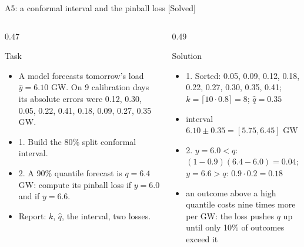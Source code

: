 \begin{frame}{A5: a conformal interval and the pinball loss [Solved]}
\itemsize{\scriptsize}
\begin{columns}[T]
\begin{column}{0.47\textwidth}
\begin{block}{Task}
\begin{itemize}
    \item A model forecasts tomorrow's load $\hat y = 6.10$ GW. On 9 calibration days its absolute errors were 0.12, 0.30, 0.05, 0.22, 0.41, 0.18, 0.09, 0.27, 0.35 GW.
    \item 1. Build the 80\% split conformal interval.
    \item 2. A 90\% quantile forecast is $q = 6.4$ GW: compute its pinball loss if $y = 6.0$ and if $y = 6.6$.
    \item Report: $k$, $\hat q$, the interval, two losses.
\end{itemize}
\end{block}
\end{column}
\begin{column}{0.49\textwidth}
\begin{exampleblock}{Solution}
\begin{itemize}
    \item 1. Sorted: 0.05, 0.09, 0.12, 0.18, 0.22, 0.27, 0.30, 0.35, 0.41; $k = \lceil 10 \cdot 0.8 \rceil = 8$; $\hat q = 0.35$
    \item interval $6.10 \pm 0.35 = [5.75, 6.45]$ GW
    \item 2. $y = 6.0 < q$: $(1 - 0.9)(6.4 - 6.0) = 0.04$; $y = 6.6 > q$: $0.9 \cdot 0.2 = 0.18$
    \item an outcome above a high quantile costs nine times more per GW: the loss pushes $q$ up until only 10\% of outcomes exceed it
\end{itemize}
\end{exampleblock}
\end{column}
\end{columns}
\end{frame}

